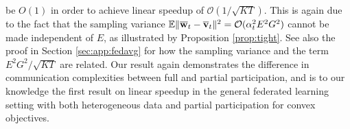 be $O(1)$ in order to achieve linear speedup of $\mathcal{O}(1/\sqrt{KT})$. This is again due to the fact that the sampling variance $\mathbb{E}\|{\overline{\mathbf{w}}}_t-{\overline{\mathbf{v}}}_t\|^2=\mathcal{O}(\alpha_t^2 E^2G^2)$ cannot be made independent of $E$, as illustrated by Proposition \ref{prop:tight}. See also the proof in Section \ref{sec:app:fedavg} for how the sampling variance and the term $E^2G^2/\sqrt{KT}$ are related.  Our result again demonstrates the difference in communication complexities
between full and partial participation, and is to our knowledge the
first result on linear speedup in the general federated learning setting
with both heterogeneous data and partial participation for convex objectives.
\begin{comment}
\textbf{Learning rate. }The learning rate now depends on the final
horizon $T$ of the convergence statement, whereas in the strongly
convex case the learning rate decays as $\mathcal{O}(1/t)$. Such
a requirement $\alpha_{t}=\mathcal{O}(\sqrt{N/T})$ also presents
in \cite{haddadpour2019convergence,yu2019parallel} on non-convex
problems with $\mathcal{O}(1/\sqrt{NT})$ linear speedup convergence results. 
\end{comment}